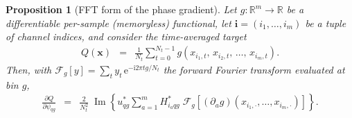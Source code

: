 \documentclass[10pt,a4paper]{article}
\numberwithin{equation}{section}
\newcommand{\block}[1]{\left[#1\right]}
\newcommand{\mat}[1]{\left(#1\right)}
\newcommand{\im}[1]{\operatorname{Im}\left\{#1\right\}}
\newcommand{\m}[1]{\mathrm{#1}}
\newtheorem{proposition}{Proposition}
\begin{document}
\begin{proposition}[FFT form of the phase gradient]\label{prop:fft}
Let $g:\mathbb{R}^m\to\mathbb{R}$ be a differentiable per-sample (memoryless) functional, let $\mathbf{i} = \mat{i_1,\ldots,i_m}$ be a tuple of channel indices, and consider the time-averaged target
\begin{eqnarray}
Q\mat{\mathbf{x}} &=& \frac{1}{N_t}\sum_{t=0}^{N_t-1} g\mat{x_{i_1, t},\, x_{i_2, t},\, \ldots,\, x_{i_m, t}}.
\end{eqnarray}
Then, with $\mathcal{F}_g\block{y} = \sum_t y_t\,\m{e}^{-\m{i} 2\pi t g/N_t}$ the forward Fourier transform evaluated at bin $g$,
\begin{eqnarray}
\frac{\partial Q}{\partial \psi_{q g}}
	&=& \frac{2}{N_t^2}\;\im{u_{q g}^* \sum_{a=1}^{m} H_{i_a q g}^*\;\mathcal{F}_g\block{\mat{\partial_a g}\mat{x_{i_1,\cdot},\ldots,x_{i_m,\cdot}}}}.
\end{eqnarray}
\end{proposition}
\end{document}

